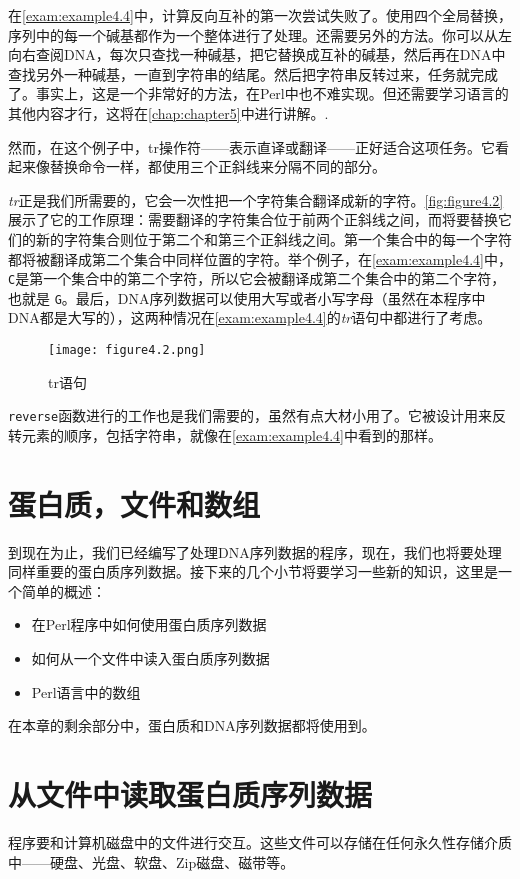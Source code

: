 在\autoref{exam:example4.4}中，计算反向互补的第一次尝试失败了。使用四个全局替换，序列中的每一个碱基都作为一个整体进行了处理。还需要另外的方法。你可以从左向右查阅DNA，每次只查找一种碱基，把它替换成互补的碱基，然后再在DNA中查找另外一种碱基，一直到字符串的结尾。然后把字符串反转过来，任务就完成了。事实上，这是一个非常好的方法，在Perl中也不难实现。但还需要学习语言的其他内容才行，这将在\autoref{chap:chapter5}中进行讲解。.

然而，在这个例子中，tr操作符——表示直译或翻译——正好适合这项任务。它看起来像替换命令一样，都使用三个正斜线来分隔不同的部分。

\textit{tr}正是我们所需要的，它会一次性把一个字符集合翻译成新的字符。\autoref{fig:figure4.2}展示了它的工作原理：需要翻译的字符集合位于前两个正斜线之间，而将要替换它们的新的字符集合则位于第二个和第三个正斜线之间。第一个集合中的每一个字符都将被翻译成第二个集合中同样位置的字符。举个例子，在\autoref{exam:example4.4}中， \verb|C|是第一个集合中的第二个字符，所以它会被翻译成第二个集合中的第二个字符，也就是 \verb|G|。最后，DNA序列数据可以使用大写或者小写字母（虽然在本程序中DNA都是大写的），这两种情况在\autoref{exam:example4.4}的\textit{tr}语句中都进行了考虑。

\begin{figure}
  \centering
  \texttt{[image: figure4.2.png]}
  \caption{tr语句}
  \label{fig:figure4.2}
\end{figure}

 \verb|reverse|函数进行的工作也是我们需要的，虽然有点大材小用了。它被设计用来反转元素的顺序，包括字符串，就像在\autoref{exam:example4.4}中看到的那样。

\section{蛋白质，文件和数组}
到现在为止，我们已经编写了处理DNA序列数据的程序，现在，我们也将要处理同样重要的蛋白质序列数据。接下来的几个小节将要学习一些新的知识，这里是一个简单的概述：

\begin{itemize}
  \item 在Perl程序中如何使用蛋白质序列数据
  \item 如何从一个文件中读入蛋白质序列数据
  \item Perl语言中的数组
\end{itemize}

在本章的剩余部分中，蛋白质和DNA序列数据都将使用到。

\section{从文件中读取蛋白质序列数据}
程序要和计算机磁盘中的文件进行交互。这些文件可以存储在任何永久性存储介质中——硬盘、光盘、软盘、Zip磁盘、磁带等。

